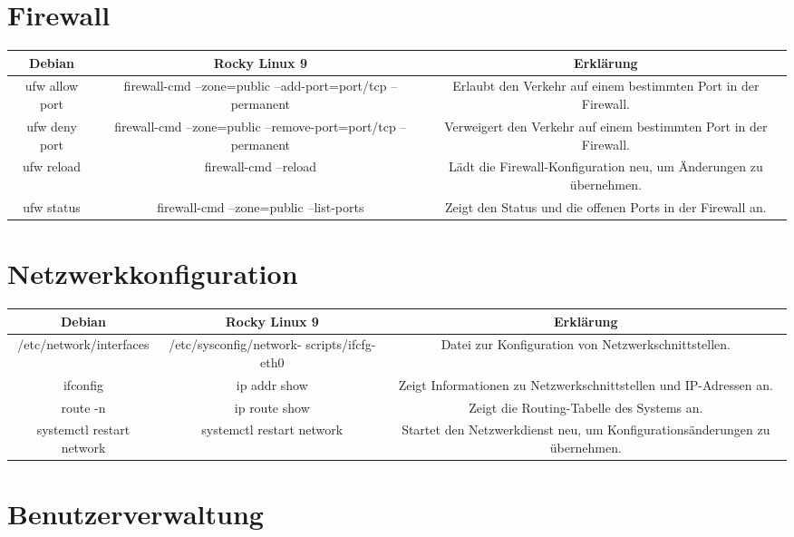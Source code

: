 \documentclass{article}
\begin{document}
\section*{Firewall}

\begin{tabularx}{\textwidth}{CCC}
  \textbf{Debian} & \textbf{Rocky Linux 9} & \textbf{Erklärung} \\
  \hline
  ufw allow port & firewall-cmd --zone=public --add-port=port/tcp --permanent & Erlaubt den Verkehr auf einem bestimmten Port in der Firewall. \\
  ufw deny port & firewall-cmd --zone=public --remove-port=port/tcp --permanent & Verweigert den Verkehr auf einem bestimmten Port in der Firewall. \\
  ufw reload & firewall-cmd --reload & Lädt die Firewall-Konfiguration neu, um Änderungen zu übernehmen. \\
  ufw status & firewall-cmd --zone=public --list-ports & Zeigt den Status und die offenen Ports in der Firewall an. \\
\end{tabularx}

\section*{Netzwerkkonfiguration}

\begin{tabularx}{\textwidth}{CCC}
  \textbf{Debian} & \textbf{Rocky Linux 9} & \textbf{Erklärung} \\
  \hline
  /etc/network/interfaces & /etc/sysconfig/network-
  scripts/ifcfg-eth0 & Datei zur Konfiguration von Netzwerkschnittstellen. \\
  ifconfig & ip addr show & Zeigt Informationen zu Netzwerkschnittstellen und IP-Adressen an. \\
  route -n & ip route show & Zeigt die Routing-Tabelle des Systems an. \\
  systemctl restart network & systemctl restart network & Startet den Netzwerkdienst neu, um Konfigurationsänderungen zu übernehmen. \\
\end{tabularx}

\section*{Benutzerverwaltung}
\end{document}
